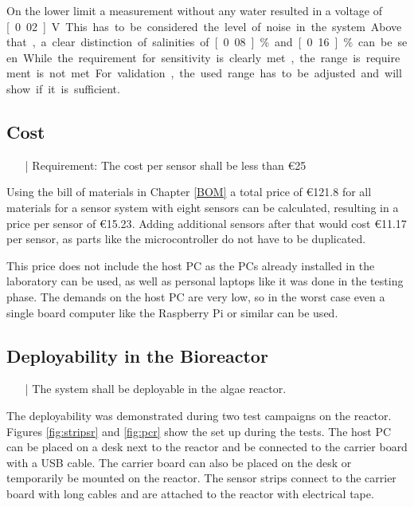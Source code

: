 On the lower limit a measurement without any water resulted in a voltage of \unit[0.02]{V}. This has to be considered the level of noise in the system. Above that, a clear distinction of salinities of \unit[0.08]{\%} and \unit[0.16]{\%} can be seen.
While the requirement for sensitivity is clearly met, the range is requirement is not met. For validation, the used range has to be adjusted and will show if it is sufficient.

\subsection{Cost}

\begin{itemize}
\item[|] Requirement: The cost per sensor shall be less than \euro{25}
\end{itemize}

Using the bill of materials in Chapter \ref{BOM} a total price of \euro{121.8} for all materials for a sensor system with eight sensors can be calculated, resulting in a price per sensor of \euro{15.23}. Adding additional sensors after that would cost \euro{11.17} per sensor, as parts like the microcontroller do not have to be duplicated.

This price does not include the host PC as the PCs already installed in the laboratory can be used, as well as personal laptops like it was done in the testing phase. The demands on the host PC are very low, so in the worst case even a single board computer like the Raspberry Pi or similar can be used.

\subsection{Deployability in the Bioreactor}

\begin{itemize}
\item[|] The system shall be deployable in the algae reactor.\\
\end{itemize}

The deployability was demonstrated during two test campaigns on the reactor. Figures \ref{fig:stripsr} and \ref{fig:pcr} show the set up during the tests. The host PC can be placed on a desk next to the reactor and be connected to the carrier board with a USB cable. The carrier board can also be placed on the desk or temporarily be mounted on the reactor. The sensor strips connect to the carrier board with long cables and are attached to the reactor with electrical tape.


